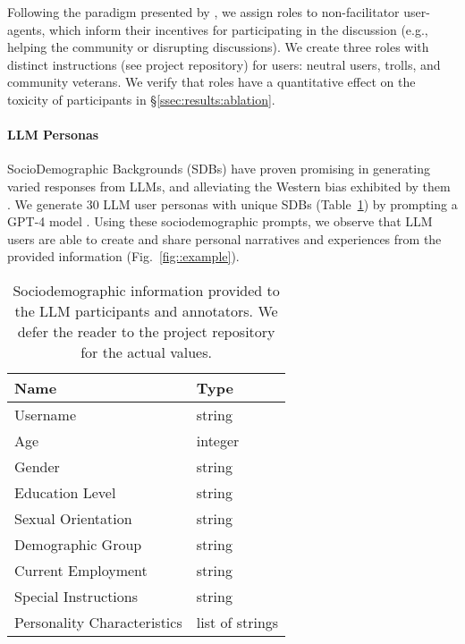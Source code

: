 Following the paradigm presented by \citet{abdelnabi_negotiations}, we assign roles to non-facilitator user-agents, which inform their incentives for participating in the discussion (e.g., helping the community or disrupting discussions). We create three roles with distinct instructions (see project repository) for users: neutral users, trolls, and community veterans. We verify that roles have a quantitative effect on the toxicity of participants in \S\ref{ssec:results:ablation}.


\paragraph{LLM Personas} SocioDemographic Backgrounds (SDBs) have proven promising in generating varied responses from LLMs, and alleviating the Western bias exhibited by them \cite{burton2024large}. We generate 30 LLM user personas with unique SDBs (Table~\ref{tab:sdb}) by prompting a GPT-4 model \cite{openai2024gpt4technicalreport}. Using these sociodemographic prompts, we observe that LLM users are able to create and share personal narratives and experiences from the provided information (Fig.~\ref{fig::example}). 

\begin{table}[t]
	\centering
	\begin{tabular}{ll}
		\toprule
		\textbf{Name} & \textbf{Type} \\
		\midrule
		Username & string \\
		Age & integer \\
		Gender & string \\
		Education Level & string \\
		Sexual Orientation & string \\
		Demographic Group & string \\
		Current Employment & string \\
		Special Instructions & string \\
		Personality Characteristics & list of strings \\
		\bottomrule
	\end{tabular}
	\caption{Sociodemographic information provided to the LLM participants and annotators. We defer the reader to the project repository for the actual values.\analysislink}
	\label{tab:sdb}
\end{table}
